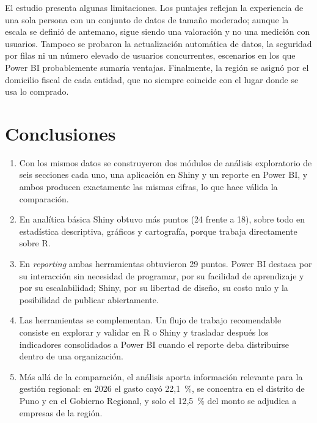 \documentclass[12pt,a4paper]{article}
\begin{document}
El estudio presenta algunas limitaciones. Los puntajes reflejan la experiencia de una sola
persona con un conjunto de datos de tamaño moderado; aunque la escala se definió de antemano, sigue siendo
una valoración y no una medición con usuarios. Tampoco se probaron la actualización automática de datos, la
seguridad por filas ni un número elevado de usuarios concurrentes, escenarios en los que Power BI probablemente sumaría
ventajas. Finalmente, la región se asignó por el domicilio fiscal de cada entidad, que no siempre coincide
con el lugar donde se usa lo comprado.

\section{Conclusiones}
\begin{enumerate}
\item Con los mismos datos se construyeron dos módulos de análisis exploratorio de seis secciones cada uno,
una aplicación en Shiny y un reporte en Power BI, y ambos producen exactamente las mismas cifras, lo que
hace válida la comparación.
\item En analítica básica Shiny obtuvo más puntos (24 frente a 18), sobre todo en estadística descriptiva,
gráficos y cartografía, porque trabaja directamente sobre R.
\item En \emph{reporting} ambas herramientas obtuvieron 29 puntos. Power BI destaca por su interacción sin necesidad de programar, por
su facilidad de aprendizaje y por su escalabilidad; Shiny, por su libertad de diseño, su costo nulo y
la posibilidad de publicar abiertamente.
\item Las herramientas se complementan. Un flujo de trabajo recomendable consiste en explorar y validar en R o Shiny y trasladar
después los indicadores consolidados a Power BI cuando el reporte deba distribuirse dentro de una
organización.
\item Más allá de la comparación, el análisis aporta información relevante para la gestión regional: en 2026 el
gasto cayó 22,1~\%, se concentra en el distrito de Puno y en el Gobierno Regional, y solo el 12,5~\% del
monto se adjudica a empresas de la región.
\end{enumerate}

\newpage
\end{document}
